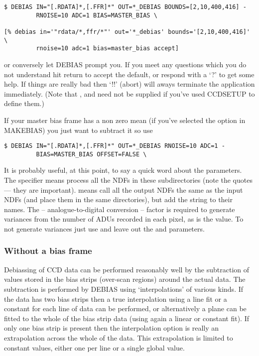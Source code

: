 \begin{myquote}
\begin{verbatim}
$ DEBIAS IN="[.RDATA]*,[.FFR]*" OUT=*_DEBIAS BOUNDS=[2,10,400,416] -
         RNOISE=10 ADC=1 BIAS=MASTER_BIAS \

[% debias in='"rdata/*,ffr/*"' out='*_debias' bounds='[2,10,400,416]' \
         rnoise=10 adc=1 bias=master_bias accept]
\end{verbatim}
\end{myquote}

or conversely let DEBIAS prompt you. If you meet any questions which you
do not understand hit return to accept the default, or respond with a
`?' to get some help. If things are really bad then `!!' (abort) will
aways terminate the application immediately. (Note that ,
 and  need not be supplied if you've used
CCDSETUP to define them.)

If your master bias frame has a non zero mean (if you've selected
the  option in MAKEBIAS) you just want to subtract 
it so use

\begin{myquote}
\begin{verbatim}
$ DEBIAS IN="[.RDATA]*,[.FFR]*" OUT=*_DEBIAS RNOISE=10 ADC=1 -
         BIAS=MASTER_BIAS OFFSET=FALSE \
\end{verbatim}
\end{myquote}

It is probably useful, at this point, to say a quick word about the
parameters. The \myverb{IN} specifier  \myverb{"[.RDATA]*,[.FFR]*"} 
means process all the NDFs in these subdirectories (note the quotes ---
they are important). \myverb{OUT=*\_DEBIAS} means call all the output
NDFs the same as the input  NDFs (and place them in the same
directories), but add the string   to their names.
The \myverb{ADC}  -- analogue-to-digital conversion --  factor is 
required to generate variances from the number of ADUs recorded in 
each pixel, as is the  value. To not generate 
variances just use  and leave out the 
 and \myverb{RNOISE} parameters.

\subsubsection{Without a bias frame}

Debiassing of CCD data can be performed reasonably well by the
subtraction of values stored in the bias strips (over-scan regions) 
around the actual data. The subtraction is performed by DEBIAS using
`interpolations' of various kinds. If the data has two bias strips then
a true interpolation using a line fit or a constant for each line of
data can be performed, or alternatively a plane can be fitted to the
whole of the bias strip data (using again a linear or constant fit). If
only one bias strip is present then the interpolation option is really
an extrapolation across the whole of the data. This extrapolation is
limited to constant values, either one per line or a single global
value.

